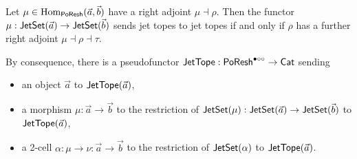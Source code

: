 \documentclass[a4paper]{memoir}
\begin{document}
\begin{theorem} \label{sec:poresh-jettope}
	Let $\mu \in {\mathrm{Hom}}_{\mathsf{PoResh}}(\vec a, \vec b)$ have a right adjoint $\mu \dashv \rho$.
	Then the functor $\mu : \mathsf{JetSet}(\vec a) \to \mathsf{JetSet}(\vec b)$ sends jet topes to jet topes if and only if $\rho$ has a further right adjoint $\mu \dashv \rho \dashv \tau$.
	
	By consequence, there is a pseudofunctor $\mathsf{JetTope} : \mathsf{PoResh}^{\bullet \circ \circ} \to {\mathsf{Cat}}$ sending
	\begin{itemize}
		\item an object $\vec a$ to $\mathsf{JetTope}(\vec a)$,
		\item a morphism $\mu : \vec a \to \vec b$ to the restriction of $\mathsf{JetSet}(\mu) : \mathsf{JetSet}(\vec a) \to \mathsf{JetSet}(\vec b)$ to $\mathsf{JetTope}(\vec a)$,
		\item a 2-cell $\alpha : \mu \to \nu : \vec a \to \vec b$ to the restriction of $\mathsf{JetSet}(\alpha)$ to $\mathsf{JetTope}(\vec a)$.
	\end{itemize}
\end{theorem}
\end{document}
